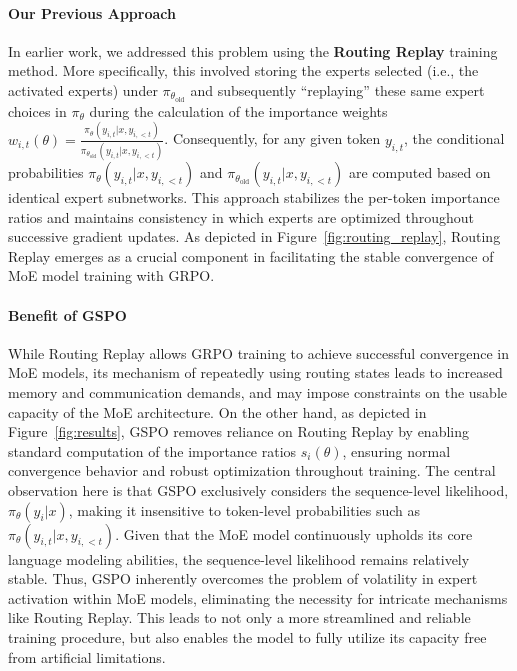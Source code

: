 \paragraph{Our Previous Approach} In earlier work, we addressed this problem using the \textbf{Routing Replay} training method. More specifically, this involved storing the experts selected (i.e., the activated experts) under $\pi_{\theta_\text{old}}$ and subsequently ``replaying'' these same expert choices in $\pi_{\theta}$ during the calculation of the importance weights $w_{i,t}(\theta) = \frac{ \pi_{\theta} (y_{i,t} | x, y_{i,<t}) }{ \pi_{\theta_\text{old}} (y_{i,t} | x,y_{i,<t})}$. Consequently, for any given token $y_{i,t}$, the conditional probabilities $\pi_{\theta} (y_{i,t} | x, y_{i,<t})$ and $\pi_{\theta_\text{old}} (y_{i,t} | x,y_{i,<t})$ are computed based on identical expert subnetworks. This approach stabilizes the per-token importance ratios and maintains consistency in which experts are optimized throughout successive gradient updates. As depicted in Figure~\ref{fig:routing_replay}, Routing Replay emerges as a crucial component in facilitating the stable convergence of MoE model training with GRPO.

\paragraph{Benefit of GSPO} While Routing Replay allows GRPO training to achieve successful convergence in MoE models, its mechanism of repeatedly using routing states leads to increased memory and communication demands, and may impose constraints on the usable capacity of the MoE architecture. On the other hand, as depicted in Figure~\ref{fig:results}, GSPO removes reliance on Routing Replay by enabling standard computation of the importance ratios $s_i(\theta)$, ensuring normal convergence behavior and robust optimization throughout training. The central observation here is that GSPO exclusively considers the sequence-level likelihood, $\pi_{\theta} (y_i | x)$, making it insensitive to token-level probabilities such as $\pi_{\theta} (y_{i,t} | x, y_{i,<t})$. Given that the MoE model continuously upholds its core language modeling abilities, the sequence-level likelihood remains relatively stable. Thus, GSPO inherently overcomes the problem of volatility in expert activation within MoE models, eliminating the necessity for intricate mechanisms like Routing Replay. This leads to not only a more streamlined and reliable training procedure, but also enables the model to fully utilize its capacity free from artificial limitations.

